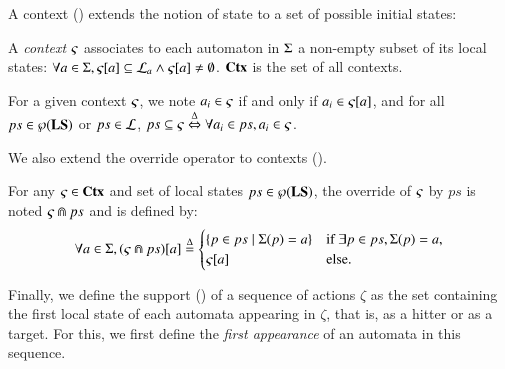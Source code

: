 A context () extends the notion of state to a set of possible initial states:
\begin{definition}
\label{def:context}
  A \emph{context} $\varsigma$ associates to each automaton in $\Sigma$ a non-empty subset of its local states:
  $\forall a \in \Sigma, {\varsigma[a]} \subseteq \mathcal{L}_a \wedge {\varsigma[a]} \neq \emptyset$.
  $\mathbf{Ctx}$ is the set of all contexts.
\end{definition}
\noindent
For a given context $\varsigma$, we note $a_i \in \varsigma$ if and only if $a_i \in {\varsigma[a]}$,
and for all $ps \in \wp(\mathbf{LS})$ or $ps \in \mathcal{L}$, $ps \subseteq \varsigma \stackrel{\Delta}\Leftrightarrow \forall a_i \in ps, a_i \in \varsigma$.
\begin{comment}
A sequence of actions $\delta$ is \emph{playable} in a context $\ctx$ if and only if 
$\exists s \subseteq \ctx, \delta \in \Sce(s)$.
We denote then: $\delta \in \Sce(\ctx)$,
and the play of $\delta$ in $\ctx$ is $\ctx \PHplay \delta = \ctx \Cap \ceil(\delta)$,
where $\ceil(\delta)$ is the set containing the last local state in the sequence $\delta$ (hitter or bounce) of every automaton mentioned in $\delta$.

\end{comment}

We also extend the override operator to contexts ().
\begin{definition}[$\Cap: \Ctx \times \powerset(\PHproc) \rightarrow \Ctx$]
\label{def:ctxcap}
  For any $\varsigma\in\mathbf{Ctx}$ and set of local states $ps \in \wp(\mathbf{LS})$,
  the override of $\varsigma$ by $ps$ is noted $\varsigma \Cap ps$ and is defined by:
  \[ \forall a \in \Sigma, {(\varsigma \Cap ps)[a]} \stackrel{\Delta}=
  \begin{cases}
    \{ p \in ps \mid \Sigma(p)=a \} & \text{if } \exists p \in ps, \Sigma(p)=a,\\
    {\varsigma[a]} & \text{else.}
  \end{cases}
  \]
\end{definition}

Finally, we define the support () of a sequence of actions $\zeta$
as the set containing the first local state of each automata appearing in $\zeta$,
that is, as a hitter or as a target.
For this, we first define the \emph{first appearance} of an automata
in this sequence.

